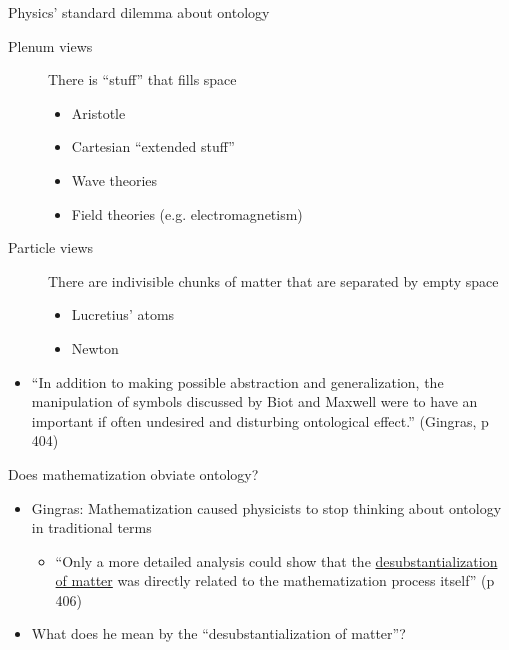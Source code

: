 \documentclass[fleqn]{beamer}
\begin{document}
\begin{frame}{Physics' standard dilemma about ontology}

  \begin{description}

  \item[Plenum views] There is ``stuff'' that fills space
    \begin{itemize}
    \item Aristotle
    \item Cartesian ``extended stuff''
    \item Wave theories
    \item Field theories (e.g. electromagnetism)
    \end{itemize}
  \item[Particle views] There are indivisible chunks of matter that
    are separated by empty space
    \begin{itemize}
    \item Lucretius' atoms
    \item Newton
    \end{itemize}
  \end{description}


\end{frame}

\begin{frame}

  \begin{itemize}
  \item ``In addition to making possible abstraction and
    generalization, the manipulation of symbols discussed by Biot and
    Maxwell were to have an important if often undesired and
    disturbing ontological effect.'' (Gingras, p 404)
  \end{itemize}
\end{frame}  


\begin{frame}{Does mathematization obviate ontology?}

  \begin{itemize}
  \item Gingras: Mathematization caused physicists to stop thinking
    about ontology in traditional terms
    \begin{itemize}
    \item ``Only a more detailed analysis could show that the
      \ul{desubstantialization of matter} was directly related to the
      mathematization process itself'' (p 406) \end{itemize}
  \item What does he mean by the ``desubstantialization of matter''?
  \end{itemize}  
\end{frame}
\end{document}
